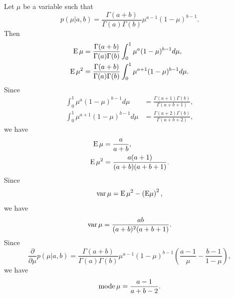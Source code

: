 \subsection{}
\label{2.6}
Let $\mu$ be a variable such that
%
\begin{equation}
p(\mu | a, b) 
= 
\frac{\Gamma(a + b)}{\Gamma(a) \Gamma(b)} 
\mu ^ {a - 1} 
(1 - \mu) ^ {b - 1}.
\end{equation}
%
Then
%
\begin{equation}
\begin{aligned}
\operatorname{E} \mu 
&= 
\frac{\Gamma(a + b)}{\Gamma(a) \Gamma(b)} 
\int_{0}^{1} 
\mu ^ a 
(1 - \mu) ^ {b - 1} 
d\mu, \\
\operatorname{E} \mu ^ 2 
&= 
\frac{\Gamma(a + b)}{\Gamma(a) \Gamma(b)} 
\int_{0}^{1} 
\mu ^ {a + 1} 
(1 - \mu) ^ {b - 1} 
d\mu.
\end{aligned}
\end{equation}
%
Since
%
\begin{equation}
\begin{aligned}
\int_{0}^{1} 
\mu ^ a 
(1 - \mu) ^ {b - 1} 
d\mu 
&= 
\frac{\Gamma (a + 1) \Gamma (b)}{\Gamma (a + b + 1)}, 
\\
\int_{0}^{1} 
\mu ^ {a + 1} 
(1 - \mu) ^ {b - 1} 
d\mu 
&= 
\frac{\Gamma (a + 2) \Gamma (b)}{\Gamma (a + b + 2)},
\end{aligned}
\end{equation}
%
we have
%
\begin{equation}
\begin{aligned}
\operatorname{E} \mu 
&= 
\frac{a}{a + b}, \\
\operatorname{E} \mu ^ 2 
&= 
\frac{a (a + 1)}{(a + b) (a + b + 1)}.
\end{aligned}
\end{equation}
%
Since
%
\begin{equation}
\operatorname{var} \mu 
= 
\operatorname{E} \mu ^ 2 
- 
\left( {\rm E \mu} \right) ^ 2,
\end{equation}
%
we have
%
\begin{equation}
\operatorname{var} \mu 
= 
\frac{a b}{(a + b) ^ 2 (a + b + 1)}.
\end{equation}
%
Since
%
\begin{equation}
\frac{\partial}{\partial \mu} p( \mu | a, b) 
= 
\frac{\Gamma(a + b)}{\Gamma(a) \Gamma(b)} 
\mu ^ {a - 1} 
(1 - \mu) ^ {b - 1} 
\left( 
	\frac{a - 1}{\mu} 
	- 
	\frac{b - 1}{1 - \mu} 
\right),
\end{equation}
%
we have
%
\begin{equation}
\operatorname{mode} \mu 
= 
\frac{a - 1}{a + b - 2}.
\end{equation}
%


